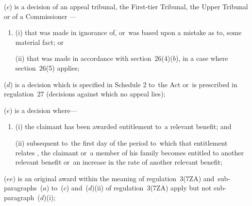 \documentclass[12pt,a4paper]{article}
\begin{document}
\begin{enumerate}
($c$) is a decision of 
an appeal tribunal, the First-tier Tribunal, the Upper Tribunal or of a Commissioner%
—
\begin{enumerate}\item[]
(i) that was made in ignorance of, or~was based upon a mistake as to, some material fact; or

(ii) that was made in accordance with section~26(4)($b$), in a case where section~26(5) applies;
\end{enumerate}

($d$) is a decision which is specified in Schedule 2 to~the Act or~is prescribed in regulation~27 (decisions against which no appeal lies); 

%

($e$) is a decision where—
\begin{enumerate}\item[]
(i) the claimant has been awarded entitlement to~a relevant benefit; and

(ii) 
subsequent to~the first day of the period to~which that entitlement relates%
, the claimant or~a member of his family becomes entitled to
another relevant benefit or~an increase in the rate of another relevant benefit;
\end{enumerate}

($ee$) is an original award within the meaning of regulation~3(7ZA) and~sub-paragraphs~($a$)  to~($c$)  and~($d$)(ii)  of regulation~3(7ZA) apply but not sub-paragraph~($d$)(i);


\end{enumerate}
\end{document}
